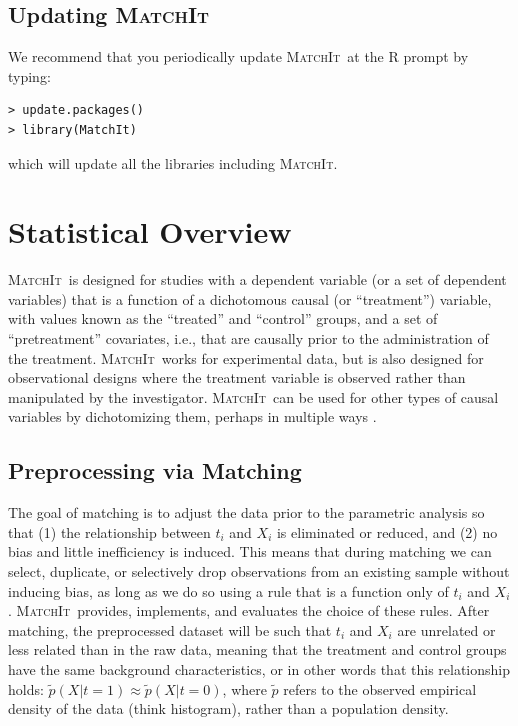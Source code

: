\documentclass[oneside,letterpaper,titlepage]{article}
\newcommand{\MatchIt}{\textsc{MatchIt}}
\begin{document}
\subsection{Updating \MatchIt}

We recommend that you periodically update \MatchIt\ at the R prompt by typing:
\begin{verbatim}
> update.packages()
> library(MatchIt) 
\end{verbatim}
which will update all the libraries including \MatchIt.


\section{Statistical Overview}

\MatchIt\ is designed for studies with a dependent variable (or a set
of dependent variables) that is a function of a dichotomous causal (or
``treatment'') variable, with values known as the ``treated'' and
``control'' groups, and a set of ``pretreatment'' covariates, i.e.,
that are causally prior to the administration of the treatment.
\MatchIt\ works for experimental data, but is also designed for
observational designs where the treatment variable is observed rather
than manipulated by the investigator.  \MatchIt\ can be used for other
types of causal variables by dichotomizing them, perhaps in multiple
ways \citep[see also][]{ImaDyk04}.

\subsection{Preprocessing via Matching}

The goal of matching is to adjust the data prior to the parametric
analysis so that (1) the relationship between $t_i$ and $X_i$ is
eliminated or reduced, and (2) no bias and little inefficiency is
induced.  This means that during matching we can select, duplicate, or
selectively drop observations from an existing sample without inducing
bias, as long as we do so using a rule that is a function only of
$t_i$ and $X_i$.  \MatchIt\ provides, implements, and evaluates the
choice of these rules.  After matching, the preprocessed dataset will
be such that $t_i$ and $X_i$ are unrelated or less related than in the
raw data, meaning that the treatment and control groups have the same
background characteristics, or in other words that this relationship
holds: $\tilde p(X|t=1) \approx \tilde p(X|t=0)$, where $\tilde p$
refers to the observed empirical density of the data (think
histogram), rather than a population density.  
\end{document}
